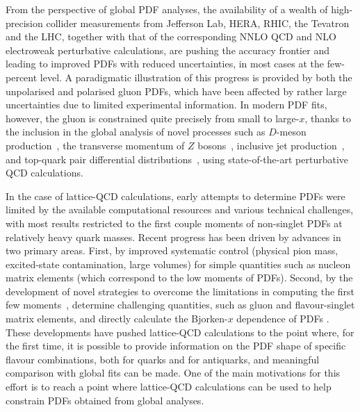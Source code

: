 From the perspective of global PDF analyses, the availability of a wealth of 
high-precision collider measurements from Jefferson Lab, HERA, RHIC, 
the Tevatron and the LHC, together with that of the corresponding
NNLO QCD and NLO electroweak perturbative calculations, are pushing the
accuracy frontier and leading to improved PDFs with reduced uncertainties,
in most cases at the few-percent level.
%
A paradigmatic illustration of this progress is provided by 
both the unpolarised and polarised gluon PDFs, 
which have been affected by rather large uncertainties due to limited 
experimental information.
%
In modern PDF fits, however, the gluon is
constrained quite precisely from small to large-$x$,
thanks to the inclusion in the
global analysis of novel processes such as $D$-meson
production~\cite{Zenaiev:2015rfa,Gauld:2016kpd},
the transverse momentum of $Z$ bosons~\cite{Boughezal:2017nla},
inclusive jet production~\cite{Currie:2016bfm},
and top-quark pair differential
distributions~\cite{Czakon:2016olj,Guzzi:2014wia}, using state-of-the-art
perturbative QCD calculations.

In the case of lattice-QCD calculations, early attempts to determine PDFs were limited by the 
available computational resources and various technical challenges, with most results restricted to
the first couple moments of non-singlet PDFs at relatively heavy quark masses.
%
Recent progress has been driven by advances in two primary areas. 
First, by improved systematic control (physical pion mass, excited-state contamination, large volumes) 
for simple quantities such as nucleon matrix elements (which correspond to the low moments of PDFs).
Second, by the  development of novel strategies to overcome the limitations in computing the first few 
moments~\cite{Constantinou:2014tga,Syritsyn:2014saa,Lin:2012ev}, determine challenging quantities, 
such as gluon and flavour-singlet matrix elements, and directly calculate the Bjorken-$x$ dependence of PDFs \cite{Lin:2014zya,Alexandrou:2015rja,Chen:2016utp,Alexandrou:2016jqi}.
%
These developments have pushed lattice-QCD calculations
to the point where, for the first time, it is possible to provide information on the PDF shape
of specific flavour combinations, both for quarks and for antiquarks, and meaningful comparison with 
global fits can be made.
%
One of the main motivations for this effort is to reach a point where lattice-QCD
calculations can be used to help constrain 
PDFs obtained from global analyses.

